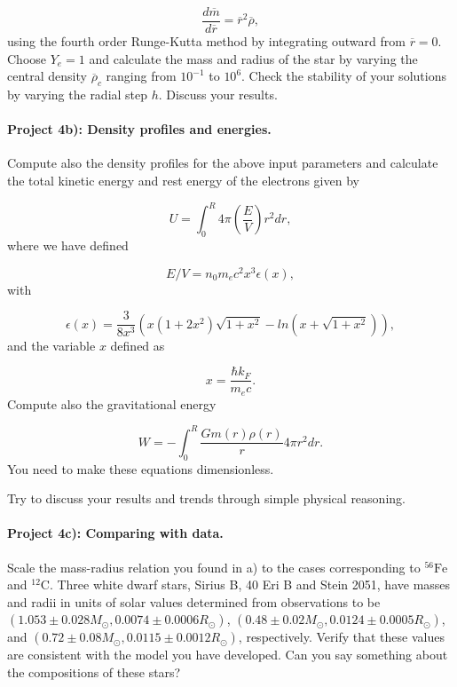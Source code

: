 \documentclass[%
oneside,                 %
final,                   %
10pt]{article}
\begin{document}
\begin{equation*}
\frac{d\overline{m}}{d\overline{r}}=
\overline{r}^{2}\overline{\rho},
\end{equation*}
using the fourth order Runge-Kutta method by integrating outward from $\overline{r}=0$.
Choose $Y_e=1$ and calculate the mass and radius of the star by varying the central density $\overline{\rho}_c$
ranging from $10^{-1}$ to $10^6$. 
Check the stability of your solutions by varying the radial step $h$. 
Discuss your results.

\paragraph{Project 4b): Density profiles and energies.}
Compute also the density profiles for the above input parameters and calculate the total kinetic energy and rest energy
of the electrons given by

\begin{equation*}
   U=\int_0^R4\pi \left( \frac{E}{V}\right )r^2dr,
\end{equation*}
where we have defined

\begin{equation*}
E/V=n_0m_ec^2x^3\epsilon (x),
\end{equation*}
with

\begin{equation*}
\epsilon (x) =
\frac{3}{8x^3}\left( x(1+2x^2)\sqrt{1+x^2}-ln(x+\sqrt{1+x^2})\right),
\end{equation*}
and the variable $x$ defined as

\begin{equation*}
x=\frac{\hbar k_F}{m_ec}.
\end{equation*}
Compute also the gravitational energy

\begin{equation*}
  W=-\int_0^R\frac{Gm(r)\rho(r)}{r}4\pi r^2dr.
\end{equation*}
You need to make these equations dimensionless. 

Try to discuss your results and trends through simple
physical reasoning.

\paragraph{Project 4c): Comparing with data.}
Scale the mass-radius relation you found in a) to the cases corresponding to $^{56}\mbox{Fe}$ and
$^{12}\mbox{C}$. Three white dwarf stars, Sirius B, 40 Eri B and Stein 2051, have masses and radii
in units of solar values determined from observations to be
$(1.053\pm0.028 M_{\odot},0.0074\pm 0.0006 R_{\odot})$, $(0.48\pm0.02 M_{\odot},0.0124\pm 0.0005 R_{\odot})$,
and $(0.72\pm0.08 M_{\odot},0.0115\pm 0.0012 R_{\odot})$, respectively.
Verify that these values are consistent with the model you have developed. Can you say something about the
compositions of these stars?
\end{document}
